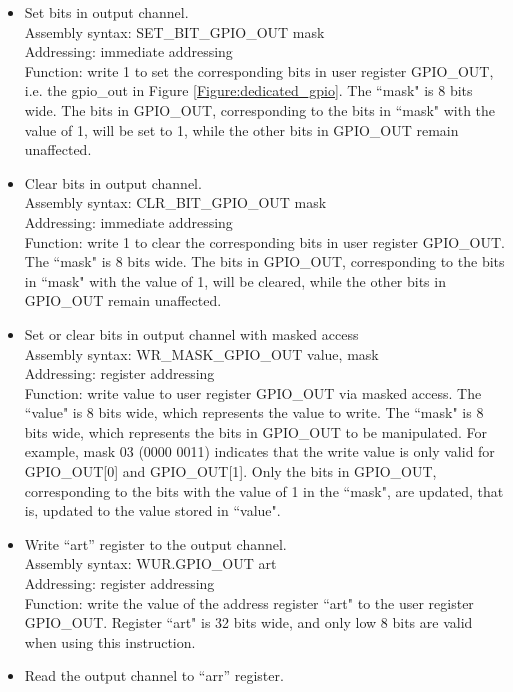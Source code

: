 \documentclass[main\_\_EN.tex]{subfiles}
\begin{document}
\begin{itemize}
    \item Set bits in output channel. \\
    Assembly syntax: SET\_BIT\_GPIO\_OUT mask \\
    Addressing: immediate addressing \\
    Function: write 1 to set the corresponding bits in user register GPIO\_OUT, i.e. the gpio\_out in Figure \ref{Figure:dedicated_gpio}. The ``mask" is 8 bits wide. The bits in GPIO\_OUT, corresponding to the bits in ``mask" with the value of 1, will be set to 1, while the other bits in GPIO\_OUT remain unaffected. \\
    \item Clear bits in output channel. \\
    Assembly syntax: CLR\_BIT\_GPIO\_OUT mask \\
    Addressing: immediate addressing \\
    Function: write 1 to clear the corresponding bits in user register GPIO\_OUT. The ``mask" is 8 bits wide. The bits in GPIO\_OUT, corresponding to the bits in ``mask" with the value of 1, will be cleared, while the other bits in GPIO\_OUT remain unaffected.
    \item Set or clear bits in output channel with masked access \\
    Assembly syntax: WR\_MASK\_GPIO\_OUT value, mask \\
    Addressing: register addressing \\
    Function: write value to user register GPIO\_OUT via masked access. The ``value" is 8 bits wide, which represents the value to write. The ``mask" is 8 bits wide, which represents the bits in GPIO\_OUT to be manipulated. For example, mask \hexprefix{}03 (0000 0011) indicates that the write value is only valid for GPIO\_OUT[0] and GPIO\_OUT[1]. Only the bits in GPIO\_OUT, corresponding to the bits with the value of 1 in the ``mask", are updated, that is, updated to the value stored in ``value".
    \item Write ``art'' register to the output channel. \\
    Assembly syntax: WUR.GPIO\_OUT art \\
    Addressing: register addressing \\
    Function: write the value of the address register ``art" to the user register GPIO\_OUT. Register ``art" is 32 bits wide, and only low 8 bits are valid when using this instruction.
    \item Read the output channel to ``arr'' register. \\

\end{itemize}
\end{document}
